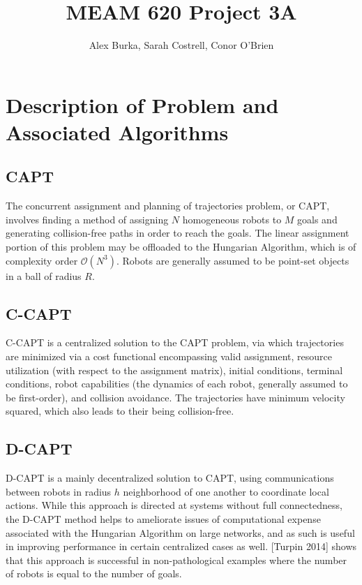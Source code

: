 \documentclass[11pt]{article}
\begin{document}
\author{Alex Burka, Sarah Costrell, Conor O'Brien}
\title{MEAM 620 Project 3A}
\maketitle

\section{Description of Problem and Associated Algorithms}

\subsection{CAPT}
The concurrent assignment and planning of trajectories problem, or CAPT, involves finding a method of assigning $N$ homogeneous robots to $M$ goals and generating collision-free paths in order to reach the goals. The linear assignment portion of this problem may be offloaded to the Hungarian Algorithm, which is of complexity order $\mathcal{O}(N^3)$. Robots are generally assumed to be point-set objects in a ball of radius $R$.

\subsection{C-CAPT}
C-CAPT is a centralized solution to the CAPT problem, via which trajectories are minimized via a cost functional encompassing valid assignment, resource utilization (with respect to the assignment matrix), initial conditions, terminal conditions, robot capabilities (the dynamics of each robot, generally assumed to be first-order), and collision avoidance. The trajectories have minimum velocity squared, which also leads to their being collision-free. 

\subsection{D-CAPT}
D-CAPT is a mainly decentralized solution to CAPT, using communications between robots in radius $h$ neighborhood of one another to coordinate local actions.  While this approach is directed at systems without full connectedness, the D-CAPT method helps to ameliorate issues of computational expense associated with the Hungarian Algorithm on large networks, and as such is useful in improving performance in certain centralized cases as well. [Turpin 2014] shows that this approach is successful in non-pathological examples where the number of robots is equal to the number of goals.
\end{document}
